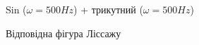 \begin{figure}[h]
	\begin{minipage}[h]{0.47\linewidth}
		 Sin ($\omega=500 Hz$) + трикутний ($\omega=500 Hz$) \\
	\end{minipage}
	\hfill
	\begin{minipage}[h]{0.47\linewidth}
		 Відповідна фігура Ліссажу \\

\end{minipage}
\end{figure}
